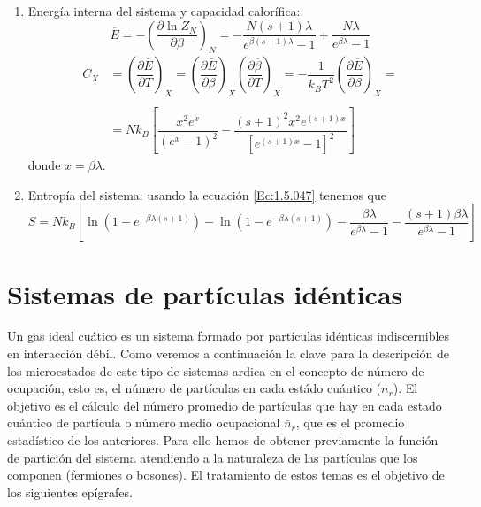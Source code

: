 \documentclass[12pt,a4paper]{article}
\numberwithin{equation}{section}
\numberwithin{figure}{section}
\newcommand{\parentesis}[1]{\left( #1  \right)}
\newcommand{\parciales}[2]{\frac{\partial #1}{\partial #2}}
\newcommand{\dparciales}[2]{\dfrac{\partial #1}{\partial #2}}
\newcommand{\ccorchetes}[1]{\left[ #1  \right]}
\theoremstyle{definition}
\begin{document}
\begin{enumerate}
\item Energía interna del sistema y capacidad calorífica:
\begin{equation}
\overline{E} = - \parentesis{\parciales{\ln Z_N}{\beta}}_N = - \frac{N(s+1) \lambda}{e^{\beta (s+1) \lambda} - 1 } + \frac{N \lambda}{e^{\beta \lambda}-1}
\end{equation}
\begin{equation}  \begin{array}{ll}
C_X & =  \parentesis{\dparciales{\overline{E}}{T}}_X =  \parentesis{\dparciales{\overline{E}}{\beta}}_X \parentesis{\dparciales{\overline{\beta}}{T}}_X = 
- \dfrac{1}{k_B T^2} \parentesis{\dparciales{\overline{E}}{\beta}}_X = \\ \\ & = Nk_B \ccorchetes{\dfrac{x^2 e^x}{(e^x - 1)^2} - \dfrac{(s+1)^2 x^2 e^{(s+1)x}}{\ccorchetes{e^{(s+1)x}-1}^2} } 
\end{array}
\end{equation}
donde $x=\beta \lambda$. 

\item Entropía del sistema: usando la ecuación \ref{Ec:1.5.047} tenemos que
\begin{equation}
S = N k_B \ccorchetes{\ln \parentesis{1-e^{-\beta \lambda (s+1)}}- \ln \parentesis{1-e^{-\beta \lambda (s+1)}}- \frac{\beta \lambda}{e^{\beta \lambda}-1} - \frac{(s+1)\beta \lambda}{e^{\beta \lambda}-1} }
\end{equation}
\end{enumerate}

\newpage

\section{Sistemas de partículas idénticas} \label{Sec:3}

Un gas ideal cuático es un sistema formado por partículas idénticas indiscernibles en interacción débil. Como veremos a continuación la clave para la descripción de los microestados de este tipo de sistemas ardica en el concepto de número de ocupación, esto es, el número de partículas en cada estádo cuántico ($n_r$). El objetivo es el cálculo del número promedio de partículas que hay en cada estado cuántico de partícula o número medio ocupacional $\bar{n}_r$, que es el promedio estadístico de los anteriores. Para ello hemos de obtener previamente la función de partición del sistema atendiendo a la naturaleza de las partículas que los componen (fermiones o bosones). El tratamiento de estos temas es el objetivo de los siguientes epígrafes. \\
\end{document}
